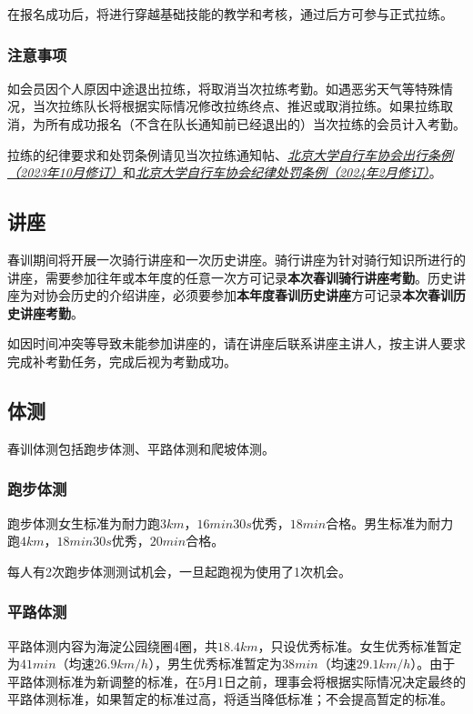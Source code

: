 \documentclass[UTF8]{ctexart}
\begin{document}
在报名成功后，将进行穿越基础技能的教学和考核，通过后方可参与正式拉练。

\subsubsection{注意事项}

如会员因个人原因中途退出拉练，将取消当次拉练考勤。如遇恶劣天气等特殊情况，当次拉练队长将根据实际情况修改拉练终点、推迟或取消拉练。如果拉练取消，为所有成功报名（不含在队长通知前已经退出的）当次拉练的会员计入考勤。


拉练的纪律要求和处罚条例请见当次拉练通知帖、\href{https://chexie.net/bbs/content/?bid=1&tid=9618&p=1}{\textit{北京大学自行车协会出行条例（2023年10月修订）}}和\href{https://chexie.net/bbs/content/?bid=1&tid=9751&p=1}{\textit{北京大学自行车协会纪律处罚条例（2024年2月修订）}}。

\subsection{讲座}


春训期间将开展一次骑行讲座和一次历史讲座。骑行讲座为针对骑行知识所进行的讲座，需要参加往年或本年度的任意一次方可记录\textbf{本次春训骑行讲座考勤}。历史讲座为对协会历史的介绍讲座，必须要参加\textbf{本年度春训历史讲座}方可记录\textbf{本次春训历史讲座考勤}。

如因时间冲突等导致未能参加讲座的，请在讲座后联系讲座主讲人，按主讲人要求完成补考勤任务，完成后视为考勤成功。

\subsection{体测}

春训体测包括跑步体测、平路体测和爬坡体测。

\subsubsection{跑步体测}

跑步体测女生标准为耐力跑$3km$，$16min30s$优秀，$18min$合格。男生标准为耐力跑$4km$，$18min30s$优秀，$20min$合格。

每人有2次跑步体测测试机会，一旦起跑视为使用了1次机会。

\subsubsection{平路体测}

平路体测内容为海淀公园绕圈4圈，共$18.4 km$，只设优秀标准。女生优秀标准暂定为$41 min$（均速$26.9 km/h$），男生优秀标准暂定为$38 min$（均速$29.1 km/h$）。由于平路体测标准为新调整的标准，在5月1日之前，理事会将根据实际情况决定最终的平路体测标准，如果暂定的标准过高，将适当降低标准；不会提高暂定的标准。
\end{document}
